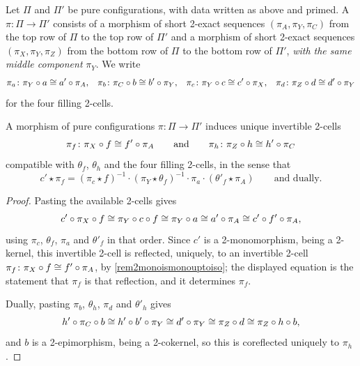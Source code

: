 \begin{definition}
  \label{Def:MorphismPure}  \leanok
  Let \(\Pi\) and \(\Pi'\) be pure configurations, with data written as above and primed. A  \(\pi\colon\Pi\to\Pi'\) consists of a morphism of short 2-exact sequences \((\pi_A,\pi_Y,\pi_C)\) from the top row of \(\Pi\) to the top row of \(\Pi'\) and a morphism of short 2-exact sequences \((\pi_X,\pi_Y,\pi_Z)\) from the bottom row of \(\Pi\) to the bottom row of \(\Pi'\), \emph{with the same middle component} \(\pi_Y\). We write
	\[
		\pi_a\colon\pi_Y\circ a\cong a'\circ\pi_A\text{,}\quad
		\pi_b\colon\pi_C\circ b\cong b'\circ\pi_Y\text{,}\quad
		\pi_c\colon\pi_Y\circ c\cong c'\circ\pi_X\text{,}\quad
		\pi_d\colon\pi_Z\circ d\cong d'\circ\pi_Y
	\]
	for the four filling 2-cells.
\end{definition}

\begin{lemma}
  \label{L:InducedVerticals}   \leanok
  A morphism of pure configurations \(\pi\colon\Pi\to\Pi'\) induces unique invertible 2-cells
	\[
		\pi_f\colon\pi_X\circ f\cong f'\circ\pi_A
		\qquad\text{and}\qquad
		\pi_h\colon\pi_Z\circ h\cong h'\circ\pi_C
	\]
	compatible with \(\theta_f\), \(\theta_h\) and the four filling 2-cells, in the sense that
	\[
		c'\star\pi_f=(\pi_c\star f)^{-1}\cdot(\pi_Y\star\theta_f)^{-1}\cdot\pi_a\cdot(\theta'_f\star\pi_A)
		\qquad\text{and dually.}
	\]
\end{lemma}

\begin{proof}
  
  \leanok
  Pasting the available 2-cells gives
	\[
		c'\circ\pi_X\circ f\cong\pi_Y\circ c\circ f\cong\pi_Y\circ a\cong a'\circ\pi_A\cong c'\circ f'\circ\pi_A\text{,}
	\]
	using \(\pi_c\), \(\theta_f\), \(\pi_a\) and \(\theta'_f\) in that order. Since \(c'\) is a 2-monomorphism, being a 2-kernel, this invertible 2-cell is reflected, uniquely, to an invertible 2-cell \(\pi_f\colon\pi_X\circ f\cong f'\circ\pi_A\), by \remx\ref{rem2monoismonouptoiso}; the displayed equation is the statement that \(\pi_f\) is that reflection, and it determines \(\pi_f\).

	Dually, pasting \(\pi_b\), \(\theta_h\), \(\pi_d\) and \(\theta'_h\) gives
	\[
		h'\circ\pi_C\circ b\cong h'\circ b'\circ\pi_Y\cong d'\circ\pi_Y\cong\pi_Z\circ d\cong\pi_Z\circ h\circ b\text{,}
	\]
	and \(b\) is a 2-epimorphism, being a 2-cokernel, so this is coreflected uniquely to \(\pi_h\).
\end{proof}

